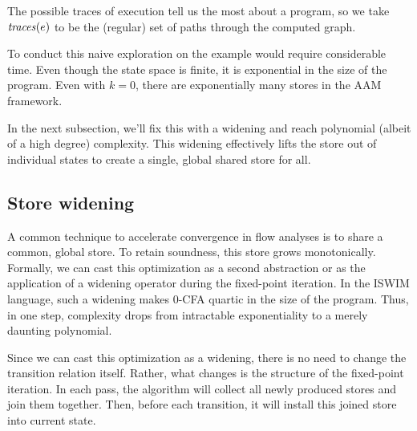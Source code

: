 \documentclass[preprint,onecolumn,9pt]{sigplanconf} %
\newcommand{\naive}{naive}
\begin{document}
The possible traces of execution tell us the most about a program, so
we take $\mathit{traces}(e)$ to be the (regular) set of paths through the
computed graph.

To conduct this \naive{} exploration on the \Church{} example would require
considerable time.  Even though the state space is finite, it is exponential in
the size of the program.  Even with $k = 0$, there are exponentially many
stores in the AAM framework.

In the next subsection, we'll fix this with a widening and reach polynomial
(albeit of a high degree) complexity.
%
This widening effectively lifts the store out of individual states to create
a single, global shared store for all.


\subsection{Store widening}
\label{sec:storewiden}

A common technique to accelerate convergence in flow analyses is to share a
common, global store.
%
To retain soundness, this store grows monotonically.
%
Formally, we can cast this optimization as a second abstraction or as the
application of a widening operator during the fixed-point iteration.
%
In the ISWIM language, such a widening makes 0-CFA quartic in the size of the
program.
%
Thus, in one step, complexity drops from intractable exponentiality to a merely
daunting polynomial.

Since we can cast this optimization as a widening, there is no need to change
the transition relation itself.
%
Rather, what changes is the structure of the fixed-point iteration.
%
In each pass, the algorithm will collect all newly produced stores and join
them together.
%
Then, before each transition, it will install this joined store into current
state.
\end{document}
